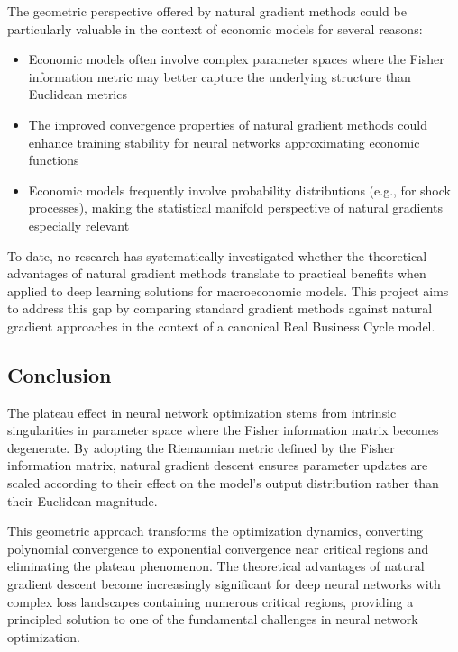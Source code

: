 \documentclass[a4paper]{article}
\begin{document}
The geometric perspective offered by natural gradient methods could be particularly valuable in the context of economic models for several reasons:

\begin{itemize}
    \item Economic models often involve complex parameter spaces where the Fisher information metric may better capture the underlying structure than Euclidean metrics
    \item The improved convergence properties of natural gradient methods could enhance training stability for neural networks approximating economic functions
    \item Economic models frequently involve probability distributions (e.g., for shock processes), making the statistical manifold perspective of natural gradients especially relevant
\end{itemize}

To date, no research has systematically investigated whether the theoretical advantages of natural gradient methods translate to practical benefits when applied to deep learning solutions for macroeconomic models. This project aims to address this gap by comparing standard gradient methods against natural gradient approaches in the context of a canonical Real Business Cycle model.



\subsection{Conclusion}

The plateau effect in neural network optimization stems from intrinsic singularities in parameter space where the Fisher information matrix becomes degenerate. By adopting the Riemannian metric defined by the Fisher information matrix, natural gradient descent ensures parameter updates are scaled according to their effect on the model's output distribution rather than their Euclidean magnitude.

This geometric approach transforms the optimization dynamics, converting polynomial convergence to exponential convergence near critical regions and eliminating the plateau phenomenon. The theoretical advantages of natural gradient descent become increasingly significant for deep neural networks with complex loss landscapes containing numerous critical regions, providing a principled solution to one of the fundamental challenges in neural network optimization.
\printbibliography{}
\newpage
\end{document}
